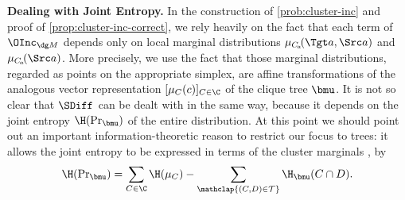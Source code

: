 \textbf{Dealing with Joint Entropy.}
%
In the construction of \eqref{prob:cluster-inc}
and proof of \cref{prop:cluster-inc-correct}, we rely
heavily on the fact that
each term of $\OInc_{\dg M}$
depends only on local marginal distributions $\mu_{C_{\mskip-2mu a}}\!(\Tgt a,  \Src a)$
and $\mu_{C_{\mskip-2mu a}}\!(\Src a)$.
More precisely, we use the fact that those marginal distributions, regarded as points on the appropriate simplex, are affine transformations of the analogous vector representation $[\mu_{C}(c) ]_{C \in \C}$ of the clique tree $\bmu$.
It is not so clear that $\SDiff_{}$ can be dealt with in the same way, because it depends on the joint entropy $\H(\Pr_{\bmu})$ of the entire distribution.
At this point we should point out an important information-theoretic reason to restrict our focus to trees:
it allows the joint entropy to be expressed
in terms of the cluster marginals \parencite{wainwright2008graphical},
by
\begin{equation}\label{eq:bethe-entropy}
    \H(\Pr\nolimits_{\bmu})
        = \sum_{C \in \C} \H(\mu_C)
        - \sum_{\mathclap{(C,D) \in \mathcal T}} \H_{\bmu}(C \cap D).
\end{equation}
